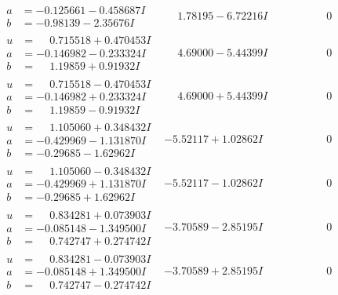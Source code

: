 \documentclass[1p]{elsarticle_modified}
\theoremstyle{definition}
\begin{document}
$$\begin{array}{c|c|c}
\begin{aligned}
a &= -0.125661 - 0.458687 I \\
b &= -0.98139 - 2.35676 I\end{aligned}
 & \phantom{-}1.78195 - 6.72216 I & \phantom{-0.000000 } 0 \\ \hline\begin{aligned}
u &= \phantom{-}0.715518 + 0.470453 I \\
a &= -0.146982 - 0.233324 I \\
b &= \phantom{-}1.19859 + 0.91932 I\end{aligned}
 & \phantom{-}4.69000 - 5.44399 I & \phantom{-0.000000 } 0 \\ \hline\begin{aligned}
u &= \phantom{-}0.715518 - 0.470453 I \\
a &= -0.146982 + 0.233324 I \\
b &= \phantom{-}1.19859 - 0.91932 I\end{aligned}
 & \phantom{-}4.69000 + 5.44399 I & \phantom{-0.000000 } 0 \\ \hline\begin{aligned}
u &= \phantom{-}1.105060 + 0.348432 I \\
a &= -0.429969 - 1.131870 I \\
b &= -0.29685 - 1.62962 I\end{aligned}
 & -5.52117 + 1.02862 I & \phantom{-0.000000 } 0 \\ \hline\begin{aligned}
u &= \phantom{-}1.105060 - 0.348432 I \\
a &= -0.429969 + 1.131870 I \\
b &= -0.29685 + 1.62962 I\end{aligned}
 & -5.52117 - 1.02862 I & \phantom{-0.000000 } 0 \\ \hline\begin{aligned}
u &= \phantom{-}0.834281 + 0.073903 I \\
a &= -0.085148 - 1.349500 I \\
b &= \phantom{-}0.742747 + 0.274742 I\end{aligned}
 & -3.70589 - 2.85195 I & \phantom{-0.000000 } 0 \\ \hline\begin{aligned}
u &= \phantom{-}0.834281 - 0.073903 I \\
a &= -0.085148 + 1.349500 I \\
b &= \phantom{-}0.742747 - 0.274742 I\end{aligned}
 & -3.70589 + 2.85195 I & \phantom{-0.000000 } 0 \\ \hline\begin{aligned}

\end{aligned}
\end{array}$$
\end{document}
